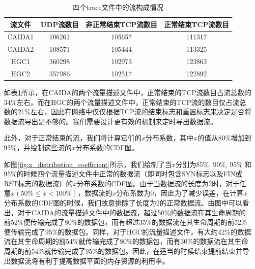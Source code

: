 \documentclass{article}
\begin{document}
\begin{table}[ht!]
	\centering
	\caption{四个trace文件中的流构成情况}
	\label{table: flows_in_traces_makeup}
	\begin{tabular} {c | c | c | c}
		\hline\hline
		流文件	& UDP流数目	 & 非正常结束TCP流数目 &	正常结束TCP流数目\\
		\hline
		CAIDA1 &	106261 &	105657 &	111317\\
		\hline
		CAIDA2 & 	108571 &	105444 &	113325 \\
		\hline
		HGC1 &	360298 &	102973 &	123863 \\
		\hline
		HGC2 &	357986 &	102517 &	122892\\
		\hline\hline
	\end{tabular}
\end{table}

如表\ref{table: flows_in_traces_makeup}所示，在CAIDA的两个流量描述文件中，正常结束的TCP流数目占流总数的34\%左右，而在HGC的两个流量描述文件中，正常结束的TCP流的数目仅占流总数的21\%左右，因此在网络中仅仅根据TCP流的结束标志和重置标志来决定是否将数据流导出是不够的。我们需要设计更有效的机制来定时导出数据流。

此外，对于正常结束的流，我们将计算它们的$x$分布系数，其中$x$的值从80\%增加到95\%，并绘制这些流的$x$分布系数的CDF图。

如图\ref{fig:x_distribution_coefficient}所示，我们绘制了当$x$分别为85\%, 90\%, 95\% 和95\%的时候四个流量描述文件中正常的数据流（即同时包含SYN标志以及FIN或RST标志的数据流）的$x$分布系数的CDF图。由于当数据流的长度为2时，对于任意$x (50\% \le x < 100\%)$，数据流的$x$分布系数为0，因此为了减少误差，在计算$x$分布系数的CDF图的时候，我们故意排除了长度为2的正常数据流。由图中可以看出，对于CAIDA的流量描述文件中的数据流，超过50\%的数据流在其生命周期的前52\%便传输完成了80\%的数据包，而有超过35\%的数据流在其生命周期的前52\%便传输完成了95\%的数据包。同样，对于HGC的流量描述文件，有大约42\%的数据流在其生命周期的前54\%就传输完成了80\%的数据包，而有30\%的数据流在其生命周期的前54\%就传输完成了95\%的数据包。因此，在适当的时候结束提前结束并导出数据流将有利于提高数据平面的内存资源的利用率。
\end{document}
